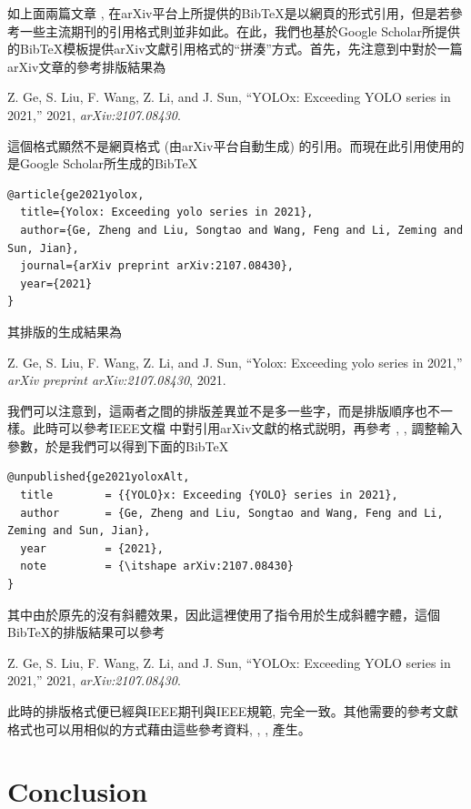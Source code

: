 \documentclass[12pt]{report}
\theoremstyle{plain}
\begin{document}
如上面兩篇文章 \cite{redmon2016lookonceunifiedrealtime}, \cite{vaswani2023attentionneed} 在arXiv平台上所提供的BibTeX是以網頁的形式引用，但是若參考一些主流期刊的引用格式\cite{wang2024yolov8}則並非如此。在此，我們也基於Google Scholar所提供的BibTeX模板提供arXiv文獻引用格式的``拼湊''方式。首先，先注意到\cite{wang2024yolov8}中對於一篇arXiv文章\cite{ge2021yolox}的參考排版結果為
\begin{mdframed}
Z. Ge, S. Liu, F. Wang, Z. Li, and J. Sun, “YOLOx: Exceeding YOLO series in 2021,” 2021, \textit{arXiv:2107.08430}.
\end{mdframed}
這個格式顯然不是網頁格式 (由arXiv平台自動生成) 的引用。而現在此引用\cite{ge2021yolox}使用的是Google Scholar所生成的BibTeX
\begin{lstlisting}
@article{ge2021yolox,
  title={Yolox: Exceeding yolo series in 2021},
  author={Ge, Zheng and Liu, Songtao and Wang, Feng and Li, Zeming and Sun, Jian},
  journal={arXiv preprint arXiv:2107.08430},
  year={2021}
}
\end{lstlisting}
其排版的生成結果為
\begin{mdframed}
Z. Ge, S. Liu, F. Wang, Z. Li, and J. Sun, “Yolox: Exceeding yolo series in 2021,” \textit{arXiv preprint arXiv:2107.08430}, 2021.
\end{mdframed}
我們可以注意到，這兩者之間的排版差異並不是多一些字，而是排版順序也不一樣。此時可以參考IEEE文檔 \cite{ieeerefguide} 中對引用arXiv文獻的格式説明，再參考 \cite{ieeebib}, \cite{bibtex}, \cite{bibtexsty} 調整輸入參數，於是我們可以得到下面的BibTeX
\begin{lstlisting}
@unpublished{ge2021yoloxAlt,
  title        = {{YOLO}x: Exceeding {YOLO} series in 2021},
  author       = {Ge, Zheng and Liu, Songtao and Wang, Feng and Li, Zeming and Sun, Jian},
  year         = {2021},
  note         = {\itshape arXiv:2107.08430}
}
\end{lstlisting}
其中由於原先的沒有斜體效果，因此這裡使用了指令用於生成斜體字體，這個BibTeX的排版結果可以參考\cite{ge2021yoloxAlt}
\begin{mdframed}
Z. Ge, S. Liu, F. Wang, Z. Li, and J. Sun, “YOLOx: Exceeding YOLO series in 2021,” 2021, \textit{arXiv:2107.08430}.
\end{mdframed}
此時的排版格式便已經與IEEE期刊\cite{wang2024yolov8}與IEEE規範\cite{ieeerefguide}, \cite{ieeebib}完全一致。其他需要的參考文獻格式也可以用相似的方式藉由這些參考資料\cite{ieeerefguide}, \cite{ieeebib}, \cite{bibtex}, \cite{bibtexsty} 產生。

\chapter{Conclusion}
\end{document}
